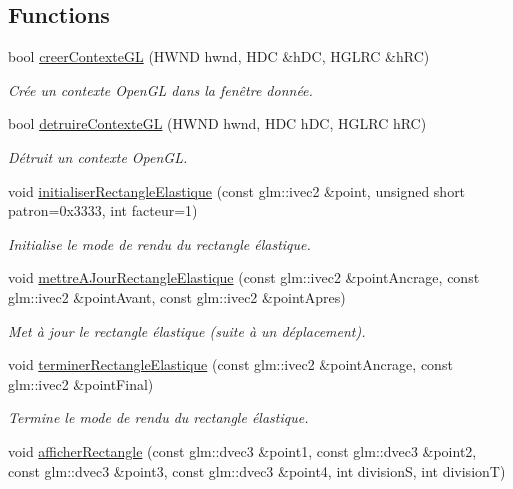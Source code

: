 \subsection*{Functions}
\begin{DoxyCompactItemize}
\item 
bool \hyperlink{namespaceaidegl_a465185be937173fdd623eb88949b212c}{creer\+Contexte\+G\+L} (H\+W\+N\+D hwnd, H\+D\+C \&h\+D\+C, H\+G\+L\+R\+C \&h\+R\+C)
\begin{DoxyCompactList}\small\item\em Crée un contexte Open\+G\+L dans la fenêtre donnée. \end{DoxyCompactList}\item 
bool \hyperlink{namespaceaidegl_a0cb31f11533480a059574970f5fcff6b}{detruire\+Contexte\+G\+L} (H\+W\+N\+D hwnd, H\+D\+C h\+D\+C, H\+G\+L\+R\+C h\+R\+C)
\begin{DoxyCompactList}\small\item\em Détruit un contexte Open\+G\+L. \end{DoxyCompactList}\item 
void \hyperlink{namespaceaidegl_a0680ab3e3bddc4c7b123c46117e31094}{initialiser\+Rectangle\+Elastique} (const glm\+::ivec2 \&point, unsigned short patron=0x3333, int facteur=1)
\begin{DoxyCompactList}\small\item\em Initialise le mode de rendu du rectangle élastique. \end{DoxyCompactList}\item 
void \hyperlink{namespaceaidegl_a900742dca102d07d9ae7efd8a5e0cce8}{mettre\+A\+Jour\+Rectangle\+Elastique} (const glm\+::ivec2 \&point\+Ancrage, const glm\+::ivec2 \&point\+Avant, const glm\+::ivec2 \&point\+Apres)
\begin{DoxyCompactList}\small\item\em Met à jour le rectangle élastique (suite à un déplacement). \end{DoxyCompactList}\item 
void \hyperlink{namespaceaidegl_a023f37325ede13a1f60243382cc11b12}{terminer\+Rectangle\+Elastique} (const glm\+::ivec2 \&point\+Ancrage, const glm\+::ivec2 \&point\+Final)
\begin{DoxyCompactList}\small\item\em Termine le mode de rendu du rectangle élastique. \end{DoxyCompactList}\item 
void \hyperlink{namespaceaidegl_ab9d35d5387a501181fe379dd596bd25d}{afficher\+Rectangle} (const glm\+::dvec3 \&point1, const glm\+::dvec3 \&point2, const glm\+::dvec3 \&point3, const glm\+::dvec3 \&point4, int division\+S, int division\+T)

\end{DoxyCompactItemize}
